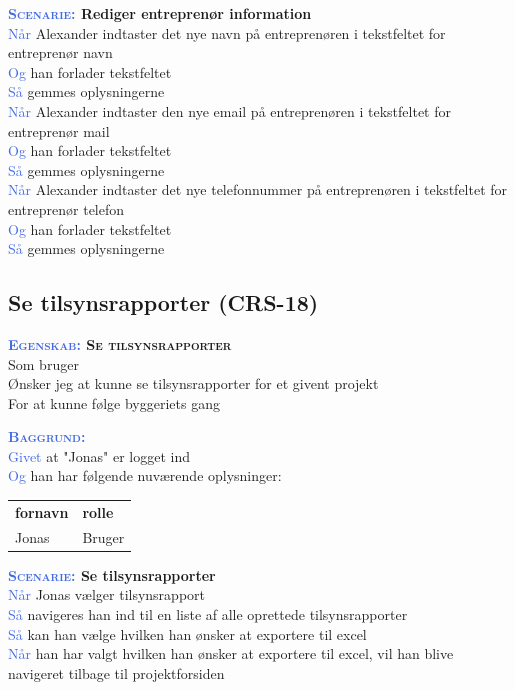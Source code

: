 \textbf{\textsc{\textcolor{RoyalBlue}{Scenarie:}} Rediger entreprenør information}\\
\textcolor{RoyalBlue}{Når} Alexander indtaster det nye navn på entreprenøren i tekstfeltet for entreprenør navn \\
\textcolor{RoyalBlue}{Og} han forlader tekstfeltet\\
\textcolor{RoyalBlue}{Så} gemmes oplysningerne\\
\textcolor{RoyalBlue}{Når} Alexander indtaster den nye email på entreprenøren i tekstfeltet for entreprenør mail \\
\textcolor{RoyalBlue}{Og} han forlader tekstfeltet\\
\textcolor{RoyalBlue}{Så} gemmes oplysningerne\\
\textcolor{RoyalBlue}{Når} Alexander indtaster det nye telefonnummer på entreprenøren i tekstfeltet for entreprenør telefon \\
\textcolor{RoyalBlue}{Og} han forlader tekstfeltet\\
\textcolor{RoyalBlue}{Så} gemmes oplysningerne\\

\subsection{Se tilsynsrapporter (CRS-18)} \label{sec:USTilsynsrapport}
\textbf{\textsc{\textcolor{RoyalBlue}{Egenskab:} Se tilsynsrapporter}}\\
Som bruger\\
Ønsker jeg at kunne se tilsynsrapporter for et givent projekt\\
For at kunne følge byggeriets gang

\textsc{\textcolor{RoyalBlue}{\textbf{Baggrund:}}}\\
\textcolor{RoyalBlue}{Givet} at "Jonas" er logget ind\\
\textcolor{RoyalBlue}{Og} han har følgende nuværende oplysninger:\\
\begin{tabular}{| l | l |}
	\textbf{fornavn} & \textbf{rolle} \\
	Jonas & Bruger\\
\end{tabular}
\newline

\textbf{\textsc{\textcolor{RoyalBlue}{Scenarie:}} Se tilsynsrapporter}\\
\textcolor{RoyalBlue}{Når} Jonas vælger tilsynsrapport\\
\textcolor{RoyalBlue}{Så} navigeres han ind til en liste af alle oprettede tilsynsrapporter\\
\textcolor{RoyalBlue}{Så} kan han vælge hvilken han ønsker at exportere til excel\\
\textcolor{RoyalBlue}{Når} han har valgt hvilken han ønsker at exportere til excel, vil han blive navigeret tilbage til projektforsiden\\


